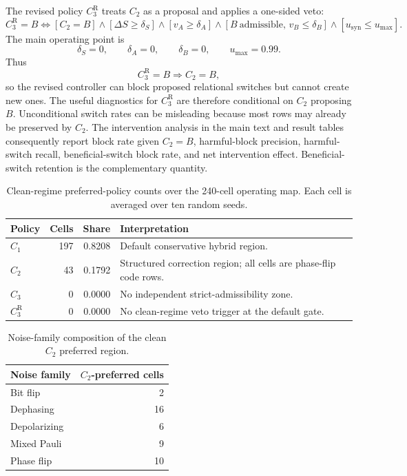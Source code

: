 \documentclass[11pt]{article}
\numberwithin{equation}{section}
\begin{document}
The revised policy $C_3^{\mathrm R}$ treats $C_2$ as a proposal and applies a
one-sided veto:
\begin{equation}
C_3^{\mathrm R}=B
\Longleftrightarrow
[C_2=B]
\wedge[\Delta S\ge\delta_S]
\wedge[v_A\ge\delta_A]
\wedge[B\ \mathrm{admissible},\,v_B\le\delta_B]
\wedge[u_{\mathrm{syn}}\le u_{\max}].
\end{equation}
The main operating point is
\begin{equation}
\delta_S=0,\qquad
\delta_A=0,\qquad
\delta_B=0,\qquad
u_{\max}=0.99.
\end{equation}
Thus
\begin{equation}
C_3^{\mathrm R}=B\Rightarrow C_2=B,
\end{equation}
so the revised controller can block proposed relational switches but cannot create
new ones.
The useful diagnostics for $C_3^{\mathrm R}$ are therefore conditional on $C_2$
proposing $B$. Unconditional switch rates can be misleading because most rows may
already be preserved by $C_2$. The intervention analysis in the main text and
result tables consequently report block rate given $C_2=B$, harmful-block
precision, harmful-switch recall, beneficial-switch block rate, and net
intervention effect.  Beneficial-switch retention is the complementary quantity.

\begin{table}[ht]
\centering
\scriptsize
\caption{Clean-regime preferred-policy counts over the 240-cell operating map.
Each cell is averaged over ten random seeds.}
\label{tab:supp-clean-policy-counts}
\begin{tabular}{@{}lrrl@{}}
\toprule
Policy & Cells & Share & Interpretation \\
\midrule
$C_1$ & 197 & 0.8208 & Default conservative hybrid region. \\
$C_2$ & 43 & 0.1792 & Structured correction region; all cells are phase-flip code rows. \\
$C_3$ & 0 & 0.0000 & No independent strict-admissibility zone. \\
$C_3^{\mathrm R}$ & 0 & 0.0000 & No clean-regime veto trigger at the default gate. \\
\bottomrule
\end{tabular}
\end{table}

\begin{table}[ht]
\centering
\scriptsize
\caption{Noise-family composition of the clean $C_2$ preferred region.}
\label{tab:supp-clean-noise-composition}
\begin{tabular}{@{}lr@{}}
\toprule
Noise family & $C_2$-preferred cells \\
\midrule
Bit flip & 2 \\
Dephasing & 16 \\
Depolarizing & 6 \\
Mixed Pauli & 9 \\
Phase flip & 10 \\
\bottomrule
\end{tabular}
\end{table}
\end{document}
